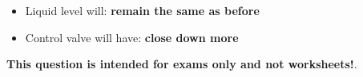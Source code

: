 





\begin{itemize}
\item{} Liquid level will: {\bf remain the same as before}  
\vskip 5pt
\item{} Control valve will have: {\bf close down more}
\end{itemize}







{\bf This question is intended for exams only and not worksheets!}.



